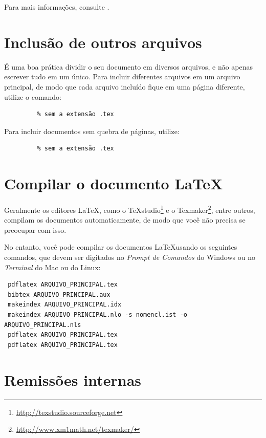 \documentclass[article,12pt,oneside,a4paper,chapter=TITLE,english,brazil]{abntex2}
\begin{document}
\begin{anexosenv}
Para mais informações, consulte .


\section{Inclusão de outros arquivos}\label{sec-include}

É uma boa prática dividir o seu documento em diversos arquivos, e não apenas escrever tudo em um único. Para incluir diferentes arquivos em um arquivo principal, de modo que cada arquivo incluído fique em uma página diferente, utilize o comando:
\begin{verbatim}
         % sem a extensão .tex
\end{verbatim}

Para incluir documentos sem quebra de páginas, utilize:
\begin{verbatim}
         % sem a extensão .tex
\end{verbatim}


\section{Compilar o documento \LaTeX}

Geralmente os editores \LaTeX, como o TeXstudio\footnote{\url{http://texstudio.sourceforge.net}} e o Texmaker\footnote{\url{http://www.xm1math.net/texmaker/}}, entre outros, compilam os documentos automaticamente, de modo que você não precisa se preocupar com isso.

No entanto, você pode compilar os documentos \LaTeX usando os seguintes comandos, que devem ser digitados no \emph{Prompt de Comandos} do Windows ou no \emph{Terminal} do Mac ou do Linux:
\begin{verbatim}
 pdflatex ARQUIVO_PRINCIPAL.tex
 bibtex ARQUIVO_PRINCIPAL.aux
 makeindex ARQUIVO_PRINCIPAL.idx 
 makeindex ARQUIVO_PRINCIPAL.nlo -s nomencl.ist -o ARQUIVO_PRINCIPAL.nls
 pdflatex ARQUIVO_PRINCIPAL.tex
 pdflatex ARQUIVO_PRINCIPAL.tex
\end{verbatim}


\section{Remissões internas}


\end{anexosenv}
\end{document}
